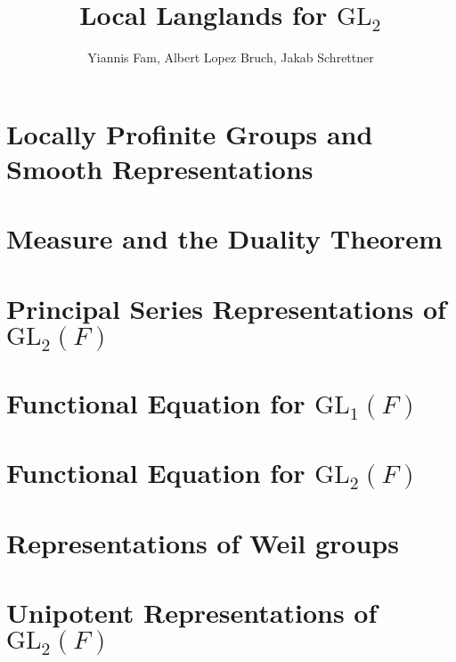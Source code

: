 \documentclass{article}
\title{Local Langlands for $\mathrm{GL}_2$}
\author{Yiannis Fam, Albert Lopez Bruch, Jakab Schrettner}
\newcommand{\GL}{\mathrm{GL}}
\theoremstyle{plain}
\theoremstyle{definition}
\begin{document}
	\maketitle
	\tableofcontents
	\newpage

\section{Locally Profinite Groups and Smooth Representations}

\section{Measure and the Duality Theorem}






\section{Principal Series Representations of \texorpdfstring{$\GL_2(F)$}{TEXT}}\label{sec:principal}






\section{Functional Equation for \texorpdfstring{$\GL_1(F)$}{TEXT}}\label{sec:func_equation}


\section{Functional Equation for \texorpdfstring{$\GL_2(F)$}{TEXT}}


\iffalse
\section{Functional Equation}

\fi

\section{Representations of Weil groups}


\section{Unipotent Representations of \texorpdfstring{$\GL_2(F)$}{TEXT}}

\newpage



\end{document}

